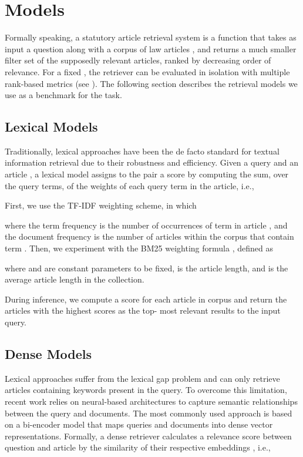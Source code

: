 \documentclass[11pt]{article}
\begin{document}
\section{Models \label{sec:models}}
Formally speaking, a statutory article retrieval system  is a function that takes as input a question  along with a corpus of law articles , and returns a much smaller filter set  of the supposedly relevant articles, ranked by decreasing order of relevance. For a fixed , the retriever can be evaluated in isolation with multiple rank-based metrics (see ). The following section describes the retrieval models we use as a benchmark for the task.

\subsection{Lexical Models}
Traditionally, lexical approaches have been the de facto standard for textual information retrieval due to their robustness and efficiency. Given a query  and an article , a lexical model assigns to the pair  a score  by computing the sum, over the query terms, of the weights of each query term  in the article, i.e.,

First, we use the TF-IDF weighting scheme, in which

where the term frequency  is the number of occurrences of term  in article , and the document frequency  is the number of articles within the corpus that contain term . Then, we experiment with the BM25 weighting formula \citep{robertson1994okapi}, defined as

where  and  are constant parameters to be fixed,  is the article length, and  is the average article length in the collection.

During inference, we compute a score for each article in corpus  and return the  articles with the highest scores as the top- most relevant results to the input query.


\subsection{Dense Models}
Lexical approaches suffer from the lexical gap problem \citep{berger2000bridging} and can only retrieve articles containing keywords present in the query. To overcome this limitation, recent work \citep{lee2019latent, karpukhin2020dense,xiong2021approximate} relies on neural-based architectures to capture semantic relationships between the query and documents. The most commonly used approach is based on a bi-encoder model \citep{gillick2018end} that maps queries and documents into dense vector representations. Formally, a dense retriever calculates a relevance score  between question  and article  by the similarity of their respective embeddings , i.e.,
\end{document}
